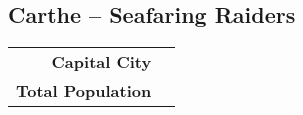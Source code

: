 \subsection{Carthe -- Seafaring Raiders}
\begin{tabular}{r | l}
    \textbf{Capital City} & \\
    \textbf{Total Population} & 
\end{tabular}